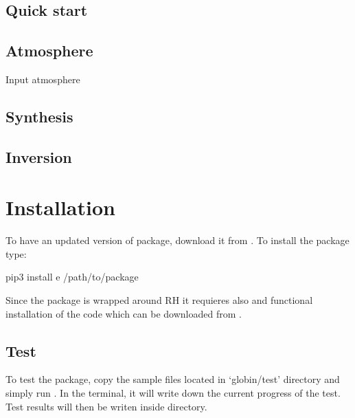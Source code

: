 \documentclass[letterpaper,10pt,english]{sphinxmanual}
\begin{document}
\section{Quick start}
\label{\detokenize{user/introduction:quick-start}}

\section{Atmosphere}
\label{\detokenize{user/introduction:atmosphere}}
Input atmosphere


\section{Synthesis}
\label{\detokenize{user/introduction:synthesis}}

\section{Inversion}
\label{\detokenize{user/introduction:inversion}}

\chapter{Installation}
\label{\detokenize{user/installation:installation}}\label{\detokenize{user/installation:install}}\label{\detokenize{user/installation::doc}}
To have an updated version of  package, download it from . To install the  package type:

\begin{sphinxVerbatim}[commandchars=\\\{\}]
pip3 install \PYGZhy{}e /path/to/package
\end{sphinxVerbatim}

Since the package is wrapped around RH it requieres also and functional installation of the code which can be downloaded from .


\section{Test}
\label{\detokenize{user/installation:test}}
To test the package, copy the sample files located in ‘globin/test’ directory and simply run . In the terminal, it will write down the current progress of the test. Test results will then be writen inside  directory.
\end{document}

